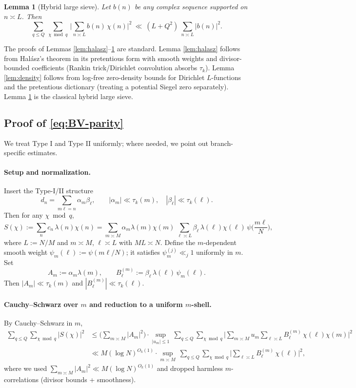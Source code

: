 \documentclass[11pt]{article}
\newtheorem{lemma}{Lemma}[section]
\theoremstyle{definition}
\theoremstyle{remark}
\begin{document}
\begin{lemma}[Hybrid large sieve]\label{lem:largesieve}
Let $b(n)$ be any complex sequence supported on $n\asymp L$. Then
\[
\sum_{q\le Q}\ \sum_{\chi\bmod q}\ \Big|\sum_{n\asymp L} b(n)\,\chi(n)\Big|^2
\ \ll\ (L+Q^2)\ \sum_{n\asymp L} |b(n)|^2.
\]
\end{lemma}

\noindent
The proofs of Lemmas \ref{lem:halasz}–\ref{lem:largesieve} are standard. Lemma \ref{lem:halasz} follows from Halász’s theorem in its pretentious form with smooth weights and divisor-bounded coefficients (Rankin trick/Dirichlet convolution absorbs $\tau_k$). Lemma \ref{lem:density} follows from log-free zero-density bounds for Dirichlet $L$-functions and the pretentious dictionary (treating a potential Siegel zero separately). Lemma \ref{lem:largesieve} is the classical hybrid large sieve.

\subsection*{Proof of \eqref{eq:BV-parity}}
We treat Type I and Type II uniformly; where needed, we point out branch-specific estimates.

\paragraph{Setup and normalization.}
Insert the Type-I/II structure
\[
d_n=\sum_{m\ell=n}\alpha_m\beta_\ell,\qquad
|\alpha_m|\ll \tau_k(m),\quad |\beta_\ell|\ll \tau_k(\ell).
\]
Then for any $\chi\bmod q$,
\[
S(\chi):=\sum_{n} c_n\,\lambda(n)\chi(n)
=\sum_{m\asymp M}\alpha_m\lambda(m)\chi(m)\ \sum_{\ell\asymp L}\beta_\ell\,\lambda(\ell)\chi(\ell)\,\psi\!\Big(\frac{m\ell}{N}\Big),
\]
where $L:=N/M$ and $m\asymp M$, $\ell\asymp L$ with $ML\asymp N$. Define the $m$-dependent smooth weight $\psi_m(\ell):=\psi(m\ell/N)$; it satisfies $\psi_m^{(j)}\ll_j 1$ uniformly in $m$.
Set
\[
A_m:=\alpha_m\lambda(m),\qquad B_\ell^{(m)}:=\beta_\ell\,\lambda(\ell)\,\psi_m(\ell).
\]
Then $|A_m|\ll \tau_k(m)$ and $|B_\ell^{(m)}|\ll \tau_k(\ell)$.

\paragraph{Cauchy–Schwarz over $m$ and reduction to a uniform $m$-shell.}
By Cauchy–Schwarz in $m$,
\begin{align*}
\sum_{q\le Q}\sum_{\chi\bmod q}|S(\chi)|^2
&\le \Big(\sum_{m\asymp M}|A_m|^2\Big)\cdot
\sup_{|u_m|\le 1}\ \sum_{q\le Q}\sum_{\chi\bmod q}
\Big|\sum_{m\asymp M} u_m \sum_{\ell\asymp L} B^{(m)}_\ell\,\chi(\ell)\chi(m)\Big|^2\\
&\ll M(\log N)^{O_k(1)}\cdot
\sup_{m\asymp M}\ \sum_{q\le Q}\sum_{\chi\bmod q}
\Big|\sum_{\ell\asymp L} B^{(m)}_\ell\,\chi(\ell)\Big|^2,
\end{align*}
where we used $\sum_{m\asymp M}|A_m|^2\ll M(\log N)^{O_k(1)}$ and dropped harmless $m$-correlations (divisor bounds + smoothness).
\end{document}
